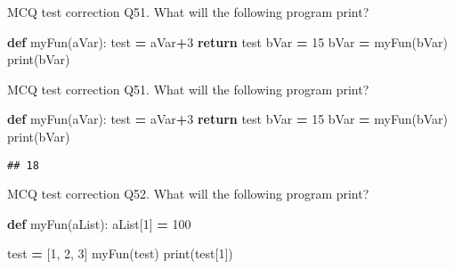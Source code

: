 \documentclass[
  8pt,
  ignorenonframetext,
]{beamer}
\newenvironment{Shaded}{\begin{snugshade}}{\end{snugshade}}
\newcommand{\BuiltInTok}[1]{#1}
\newcommand{\ControlFlowTok}[1]{\textcolor[rgb]{0.13,0.29,0.53}{\textbf{#1}}}
\newcommand{\DecValTok}[1]{\textcolor[rgb]{0.00,0.00,0.81}{#1}}
\newcommand{\KeywordTok}[1]{\textcolor[rgb]{0.13,0.29,0.53}{\textbf{#1}}}
\newcommand{\NormalTok}[1]{#1}
\newcommand{\OperatorTok}[1]{\textcolor[rgb]{0.81,0.36,0.00}{\textbf{#1}}}
\begin{document}
\begin{frame}[fragile]{MCQ test correction}
\protect\hypertarget{mcq-test-correction-100}{}
Q51. What will the following program print?

\begin{Shaded}
\begin{Highlighting}[]
\KeywordTok{def}\NormalTok{ myFun(aVar):}
\NormalTok{    test }\OperatorTok{=}\NormalTok{ aVar}\OperatorTok{+}\DecValTok{3}
    \ControlFlowTok{return}\NormalTok{ test}
\NormalTok{bVar }\OperatorTok{=} \DecValTok{15}
\NormalTok{bVar }\OperatorTok{=}\NormalTok{ myFun(bVar)}
\BuiltInTok{print}\NormalTok{(bVar)}
\end{Highlighting}
\end{Shaded}
\end{frame}

\begin{frame}[fragile]{MCQ test correction}
\protect\hypertarget{mcq-test-correction-101}{}
Q51. What will the following program print?

\begin{Shaded}
\begin{Highlighting}[]
\KeywordTok{def}\NormalTok{ myFun(aVar):}
\NormalTok{    test }\OperatorTok{=}\NormalTok{ aVar}\OperatorTok{+}\DecValTok{3}
    \ControlFlowTok{return}\NormalTok{ test}
\NormalTok{bVar }\OperatorTok{=} \DecValTok{15}
\NormalTok{bVar }\OperatorTok{=}\NormalTok{ myFun(bVar)}
\BuiltInTok{print}\NormalTok{(bVar)}
\end{Highlighting}
\end{Shaded}

\begin{verbatim}
## 18
\end{verbatim}
\end{frame}

\begin{frame}[fragile]{MCQ test correction}
\protect\hypertarget{mcq-test-correction-102}{}
Q52. What will the following program print?

\begin{Shaded}
\begin{Highlighting}[]
\KeywordTok{def}\NormalTok{ myFun(aList):}
\NormalTok{    aList[}\DecValTok{1}\NormalTok{] }\OperatorTok{=} \DecValTok{100}

\NormalTok{test }\OperatorTok{=}\NormalTok{ [}\DecValTok{1}\NormalTok{, }\DecValTok{2}\NormalTok{, }\DecValTok{3}\NormalTok{]}
\NormalTok{myFun(test)}
\BuiltInTok{print}\NormalTok{(test[}\DecValTok{1}\NormalTok{])}
\end{Highlighting}
\end{Shaded}
\end{frame}
\end{document}
